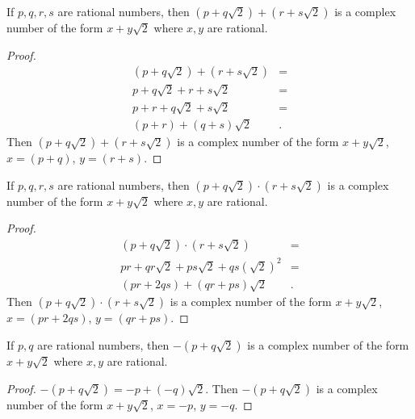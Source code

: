 \documentclass[12pt]{article}
\begin{document}
\begin{lemma}
  If $p,q,r,s$ are rational numbers, then $(p + q\sqrt{2}) + (r
  + s\sqrt{2})$ is a complex number of the form $x +
  y\sqrt{2}$ where $x, y$ are rational.
  \begin{proof}
    \begin{align*}
      (p + q\sqrt{2}) + (r + s\sqrt{2}) &=\\
      p + q\sqrt{2} + r + s\sqrt{2} &=\\
      p + r + q\sqrt{2} + s\sqrt{2} &=\\
      (p + r) + (q + s)\sqrt{2}&.
    \end{align*}
    Then $(p + q\sqrt{2}) + (r + s\sqrt{2})$ is a complex number
    of the form $x + y\sqrt{2}$, $x = (p + q)$, $y = (r + s)$.
  \end{proof}
\end{lemma}

\begin{lemma}
  If $p,q,r,s$ are rational numbers, then $(p + q\sqrt{2})
  \cdot (r + s\sqrt{2})$ is a complex number of the form $x +
  y\sqrt{2}$ where $x, y$ are rational.
  \begin{proof}
    \begin{align*}
      (p + q\sqrt{2}) \cdot (r + s\sqrt{2}) &=\\
      pr + qr\sqrt{2} + ps\sqrt{2} + qs(\sqrt{2})^{2} &=\\
      (pr + 2qs) + (qr + ps)\sqrt{2}&.
    \end{align*}
    Then $(p + q\sqrt{2}) \cdot (r + s\sqrt{2})$ is a complex
    number of the form $x + y\sqrt{2}$, $x = (pr + 2qs)$, $y =
    (qr + ps)$.
  \end{proof}
\end{lemma}

\begin{lemma}
  If $p,q$ are rational numbers, then $-(p + q\sqrt{2})$ is a
  complex number of the form $x + y\sqrt{2}$ where $x, y$ are
  rational.
  \begin{proof}
    $-(p + q\sqrt{2}) = -p + (-q)\sqrt{2}$. Then $-(p +
    q\sqrt{2})$ is a complex number of the form $x + y\sqrt{2}$,
    $x = -p$, $y = -q$.
  \end{proof}
\end{lemma}
\end{document}
